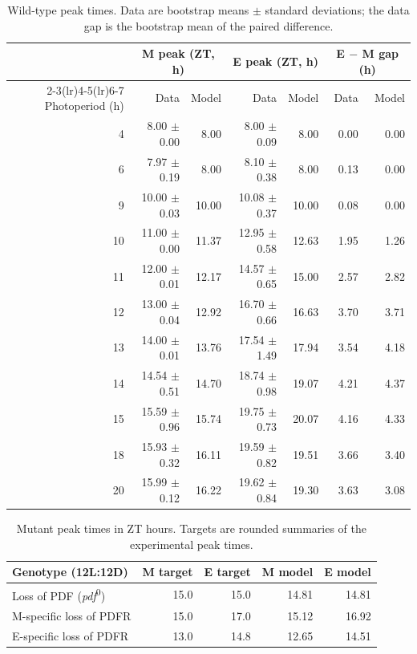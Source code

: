 \documentclass[10pt,a4paper]{article}
\newcommand{\pdfzero}{\textit{pdf}\textsuperscript{0}}
\begin{document}
\begin{table}[!htb]
\centering\small
\begin{tabular}{rrrrrrr}
\toprule
 & \multicolumn{2}{c}{M peak (ZT, h)} & \multicolumn{2}{c}{E peak (ZT, h)}
 & \multicolumn{2}{c}{E $-$ M gap (h)}\\
\cmidrule(lr){2-3}\cmidrule(lr){4-5}\cmidrule(lr){6-7}
Photoperiod (h) & Data & Model & Data & Model & Data & Model\\
\midrule
4 & 8.00 $\pm$ 0.00 & 8.00 & 8.00 $\pm$ 0.09 & 8.00 & 0.00 & 0.00 \\
6 & 7.97 $\pm$ 0.19 & 8.00 & 8.10 $\pm$ 0.38 & 8.00 & 0.13 & 0.00 \\
9 & 10.00 $\pm$ 0.03 & 10.00 & 10.08 $\pm$ 0.37 & 10.00 & 0.08 & 0.00 \\
10 & 11.00 $\pm$ 0.00 & 11.37 & 12.95 $\pm$ 0.58 & 12.63 & 1.95 & 1.26 \\
11 & 12.00 $\pm$ 0.01 & 12.17 & 14.57 $\pm$ 0.65 & 15.00 & 2.57 & 2.82 \\
12 & 13.00 $\pm$ 0.04 & 12.92 & 16.70 $\pm$ 0.66 & 16.63 & 3.70 & 3.71 \\
13 & 14.00 $\pm$ 0.01 & 13.76 & 17.54 $\pm$ 1.49 & 17.94 & 3.54 & 4.18 \\
14 & 14.54 $\pm$ 0.51 & 14.70 & 18.74 $\pm$ 0.98 & 19.07 & 4.21 & 4.37 \\
15 & 15.59 $\pm$ 0.96 & 15.74 & 19.75 $\pm$ 0.73 & 20.07 & 4.16 & 4.33 \\
18 & 15.93 $\pm$ 0.32 & 16.11 & 19.59 $\pm$ 0.82 & 19.51 & 3.66 & 3.40 \\
20 & 15.99 $\pm$ 0.12 & 16.22 & 19.62 $\pm$ 0.84 & 19.30 & 3.63 & 3.08 \\
\bottomrule
\end{tabular}
\caption{Wild-type peak times. Data are bootstrap means $\pm$ standard
deviations; the data gap is the bootstrap mean of the paired difference.}
\label{tab:wt}
\end{table}

\begin{table}[!htb]
\centering\small
\begin{tabular}{lrrrr}
\toprule
Genotype (12L:12D) & M target & E target & M model & E model\\
\midrule
Loss of PDF (\pdfzero{}) & 15.0 & 15.0 & 14.81 & 14.81 \\
M-specific loss of PDFR & 15.0 & 17.0 & 15.12 & 16.92 \\
E-specific loss of PDFR & 13.0 & 14.8 & 12.65 & 14.51 \\
\bottomrule
\end{tabular}
\caption{Mutant peak times in ZT hours. Targets are rounded summaries of
the experimental peak times.}
\label{tab:mutants}
\end{table}
\end{document}
